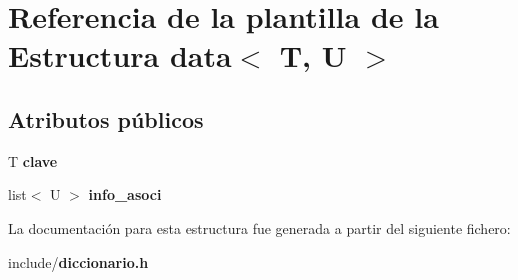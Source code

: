\section{Referencia de la plantilla de la Estructura data$<$ T, U $>$}
\label{structdata}
\subsection*{Atributos públicos}
\begin{DoxyCompactItemize}
\item 
T {\bfseries clave}\label{structdata_aa3298b9b021e026f8663005d2fc19e1a}

\item 
list$<$ U $>$ {\bfseries info\+\_\+asoci}\label{structdata_a8299bf6975cfaffbb2354a65881e16a2}

\end{DoxyCompactItemize}


La documentación para esta estructura fue generada a partir del siguiente fichero\+:\begin{DoxyCompactItemize}
\item 
include/{\bf diccionario.\+h}\end{DoxyCompactItemize}
